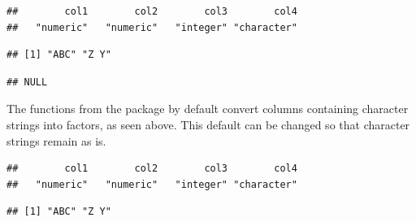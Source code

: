 \documentclass[krantz2]{krantz}\usepackage{knitr}
\begin{document}
\begin{knitrout}\footnotesize
{}\color{fgcolor}\begin{kframe}
\begin{alltt}
 \hlkwb{<-} \hlstd{(}\hlstd{,}  \hlstd{=} \hlstd{)}
\end{alltt}
\begin{verbatim}
##        col1        col2        col3        col4
##   "numeric"   "numeric"   "integer" "character"
\end{verbatim}
\begin{alltt}
\hlstd{from_csv_e.df[[}\hlstd{]]}
\end{alltt}
\begin{verbatim}
## [1] "ABC" "Z Y"
\end{verbatim}
\begin{alltt}
\hlstd{(from_csv_e.df[[}\hlstd{]])}
\end{alltt}
\begin{verbatim}
## NULL
\end{verbatim}
\end{kframe}
\end{knitrout}

The functions from the \Rlang {} package by default convert columns containing character strings into factors, as seen above. This default can be changed so that character strings remain as is.

\begin{knitrout}\footnotesize
{}\color{fgcolor}\begin{kframe}
\begin{alltt}
 \hlkwb{<-} \hlstd{(}\hlstd{,}
                           \hlstd{=} \hlstd{)}
\end{alltt}
\end{kframe}
\end{knitrout}

\begin{knitrout}\footnotesize
{}\color{fgcolor}\begin{kframe}
\begin{alltt}
\end{alltt}
\begin{verbatim}
##        col1        col2        col3        col4
##   "numeric"   "numeric"   "integer" "character"
\end{verbatim}
\begin{alltt}
\hlstd{from_csv_c.df[[}\hlstd{]]}
\end{alltt}
\begin{verbatim}
## [1] "ABC" "Z Y"
\end{verbatim}
\end{kframe}
\end{knitrout}
\end{document}

